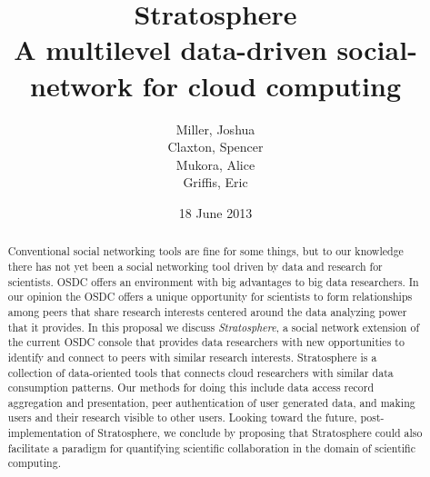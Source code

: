 

\usepackage{titlesec}
\titleformat{\subsection}[hang]{\centering\bfseries}{}{1em}{}

\title{
  Stratosphere \\ 
  \small{A multilevel data-driven social-network for cloud computing}
} 

\author{
  Miller, Joshua \\
  Claxton, Spencer \\
  Mukora, Alice \\
  Griffis, Eric
}

\date{\small{18 June 2013}}

\newcommand\XXX[1]{{\color{red} #1}}



\maketitle

\begin{abstract}

Conventional social networking tools are fine for some things, but
to our knowledge there has not yet been a social networking tool
driven by data and research for scientists. OSDC offers an
environment with big advantages to big data researchers. In our
opinion the OSDC offers a unique opportunity for scientists to form 
relationships among peers that share research interests centered
around the data analyzing power that it provides. In this proposal 
we discuss \emph{Stratosphere}, a social network extension of the current OSDC
console that provides data researchers with new opportunities to
identify and connect to peers with similar research interests.
Stratosphere is a collection of data-oriented tools that connects
cloud researchers with similar data consumption patterns. Our methods
for doing this include data access record aggregation and
presentation, peer authentication of user generated data, and making
users and their research visible to other users. Looking toward
the future, post-implementation of Stratosphere, we conclude by
proposing that Stratosphere could also facilitate a paradigm for
quantifying scientific collaboration in the domain of scientific
computing. 
 
\end{abstract}

